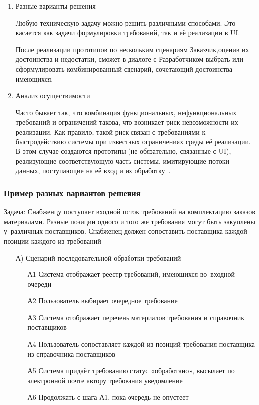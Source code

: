 \documentclass{../industrial-development}
\begin{document}
{\begin{enumerate}
\item \alert{Разные варианты решения}

Любую техническую задачу можно решить различными способами. Это касается как задачи формулировки требований, так и её реализации в UI.

После реализации прототипов по нескольким сценариям Заказчик,оценив их достоинства и недостатки, сможет в диалоге с Разработчиком выбрать или сформулировать комбинированный сценарий, сочетающий достоинства имеющихся.

\item \alert{Анализ осуществимости}

Часто бывает так, что комбинация функциональных, нефункциональных требований и ограничений такова, что возникает риск невозможности
их реализации. Как правило, такой риск связан с требованиями к быстродействию системы при известных ограничениях среды её реализации. В этом случае создаются прототипы (не обязательно, связанные с UI), реализующие соответствующую часть системы, имитирующие потоки данных, поступающие на её вход и их обработку~\cite[с.~51--52]{Maglinec}.

\end{enumerate}

\begin{frame} \frametitle {Пример разных вариантов решения}
Задача: Снабженцу поступает входной поток требований на комплектацию заказов материалами. Разные позиции одного и того же требования могут быть закуплены у~различных поставщиков. Снабженец должен сопоставить поставщика каждой позиции каждого из требований

\begin{itemize}
\item[А)] Сценарий последовательной обработки требований
\begin{itemize}
\item[А1] Система отображает реестр требований, имеющихся во~входной очереди
\item[А2] Пользователь выбирает очередное требование
\item[А3] Система отображает перечень материалов требования и справочник
поставщиков
\item[А4] Пользователь сопоставляет каждой из позиций требования поставщика из справочника поставщиков
\item[А5] Система придаёт требованию статус «обработано», высылает по электронной почте автору требования уведомление
\item[А6] Продолжать с шага А1, пока очередь не опустеет
\end{itemize}
\end{itemize}
\end{frame}

}
\end{document}
